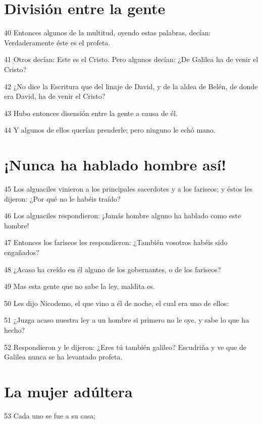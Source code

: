 \section*{División entre la gente}

\par 40 Entonces algunos de la multitud, oyendo estas palabras, decían: Verdaderamente éste es el profeta.
\par 41 Otros decían: Este es el Cristo. Pero algunos decían: ¿De Galilea ha de venir el Cristo?
\par 42 ¿No dice la Escritura que del linaje de David, y de la aldea de Belén, de donde era David, ha de venir el Cristo?
\par 43 Hubo entonces disensión entre la gente a causa de él.
\par 44 Y algunos de ellos querían prenderle; pero ninguno le echó mano.

\section*{¡Nunca ha hablado hombre así!}

\par 45 Los alguaciles vinieron a los principales sacerdotes y a los fariseos; y éstos les dijeron: ¿Por qué no le habéis traído?
\par 46 Los alguaciles respondieron: ¡Jamás hombre alguno ha hablado como este hombre!
\par 47 Entonces los fariseos les respondieron: ¿También vosotros habéis sido engañados?
\par 48 ¿Acaso ha creído en él alguno de los gobernantes, o de los fariseos?
\par 49 Mas esta gente que no sabe la ley, maldita es.
\par 50 Les dijo Nicodemo, el que vino a él de noche, el cual era uno de ellos:
\par 51 ¿Juzga acaso nuestra ley a un hombre si primero no le oye, y sabe lo que ha hecho?
\par 52 Respondieron y le dijeron: ¿Eres tú también galileo? Escudriña y ve que de Galilea nunca se ha levantado profeta.

\section*{La mujer adúltera}

\par 53 Cada uno se fue a su casa;

